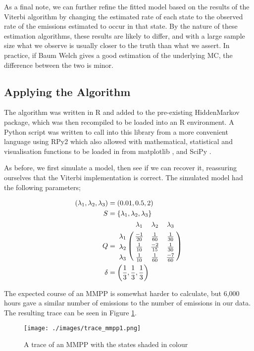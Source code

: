 As a final note, we can further refine the fitted model based on the results of the Viterbi algorithm by changing the estimated rate of each state to the observed rate of the emissions estimated to occur in that state. By the nature of these estimation algorithms, these results are likely to differ, and with a large sample size what we observe is usually closer to the truth than what we assert. In practice, if Baum Welch gives a good estimation of the underlying MC, the difference between the two is minor.

\subsection{Applying the Algorithm}

The algorithm was written in R and added to the pre-existing HiddenMarkov \cite{hiddenmarkov} package, which was then recompiled to be loaded into an R environment. A Python script was written to call into this library from a more convenient language using RPy2 \cite{rpy} which also allowed with mathematical, statistical and visualisation functions to be loaded in from matplotlib \cite{matplotlib}, and SciPy \cite{scipy}.

As before, we first simulate a model, then see if we can recover it, reassuring ourselves that the Viterbi implementation is correct. The simulated model had the following parameters;

\begin{align*}
(\lambda_1,\lambda_2,\lambda_3) &= (0.01,0.5,2)\\
S &= \{\lambda_1,\lambda_2,\lambda_3\}\\
Q &= \bordermatrix{      & \lambda_1 & \lambda_2 & \lambda_3\cr
                \lambda_1 & \frac{-1}{20} & \frac{1}{60}  & \frac{1}{30} \cr
                \lambda_2 & \frac{1}{10}  & \frac{-2}{15} & \frac{1}{30} \cr
                \lambda_3 & \frac{1}{10}  & \frac{1}{60}  & \frac{-7}{60}\cr
			}\\
\delta &= \left(\frac{1}{3},\frac{1}{3},\frac{1}{3}\right)
\end{align*}

The expected course of an MMPP is somewhat harder to calculate, but 6,000 hours gave a similar number of emissions to the number of emissions in our data. The resulting trace can be seen in Figure \ref{trace_mmpp1}.

\clearpage
\begin{figure}[h!]
\centering
\texttt{[image: ./images/trace\_mmpp1.png]}
\caption{A trace of an MMPP with the states shaded in colour \protect\footnotemark }
\label{trace_mmpp1}
\end{figure}

